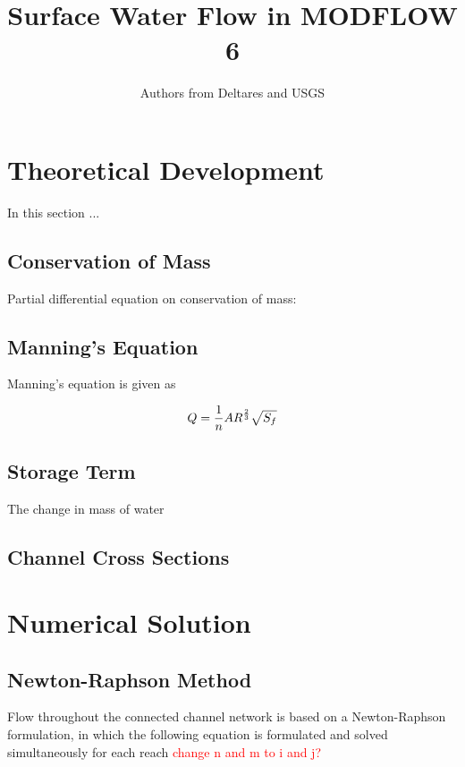 \documentclass[fleqn]{article}
\author{Authors from Deltares and USGS}
\begin{document}
\title{Surface Water Flow in MODFLOW 6}
\maketitle

\tableofcontents

\section{Theoretical Development}
In this section ...

\subsection{Conservation of Mass}
Partial differential equation on conservation of mass:

\subsection{Manning's Equation}
Manning's equation is given as

\begin{equation}
  Q = \frac{1}{n} A R^{2 \over 3} \sqrt{S_f}
\end{equation}

\subsection{Storage Term}
The change in mass of water 

\subsection{Channel Cross Sections}

\section{Numerical Solution}

\subsection{Newton-Raphson Method}

Flow throughout the connected channel network is based on a Newton-Raphson formulation, in which the following equation is formulated and solved simultaneously for each reach \textcolor{red}{change n and m to i and j?}
\end{document}

